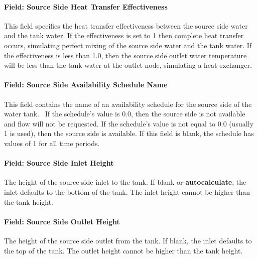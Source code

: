 \paragraph{Field: Source Side Heat Transfer
Effectiveness}\label{field-source-side-heat-transfer-effectiveness-thermalstoragehotwaterstratified}

This field specifies the heat transfer effectiveness between the source side 
water and the tank water. If the effectiveness is set to 1 then complete heat
transfer occurs, simulating perfect mixing of the source side water and the tank
water. If the effectiveness is less than 1.0, then the source side outlet water
temperature will be less than the tank water at the outlet node, simulating a
heat exchanger.

\paragraph{Field: Source Side Availability Schedule
Name}\label{field-source-side-availability-schedule-name-thermalstoragehotwaterstratified}

This field contains the name of an availability schedule for the source side of
the water tank.~ If the schedule's value is 0.0, then the source side is not
available and flow will not be requested. If the schedule's value is not equal
to 0.0 (usually 1 is used), then the source side is available. If this field is
blank, the schedule has values of 1 for all time periods.

\paragraph{Field: Source Side Inlet
Height}\label{field-source-side-inlet-height-thermalstoragehotwaterstratified}

The height of the source side inlet to the tank. If blank or
\textbf{autocalculate}, the inlet defaults to the bottom of the tank. The inlet
height cannot be higher than the tank height.

\paragraph{Field: Source Side Outlet
Height}\label{field-source-side-outlet-height-thermalstoragehotwaterstratified}

The height of the source side outlet from the tank. If blank, the inlet defaults
to the top of the tank. The outlet height cannot be higher than the tank height.

